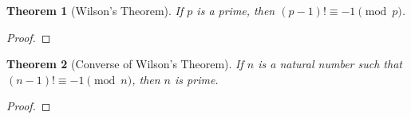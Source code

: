 \documentclass[12pt,leqno]{article}
\numberwithin{equation}{section}
\newtheorem{thm}{Theorem}[section]
\theoremstyle{definition}
\begin{document}

\begin{thm}[Wilson's Theorem]
If $p$ is a prime, then $(p - 1)! \equiv -1 \pmod{p}$.
\end{thm}
\begin{proof}[Proof]
\end{proof}

\begin{thm}[Converse of Wilson's Theorem]
If $n$ is a natural number such that $(n - 1)! \equiv -1 \pmod{n}$,
then $n$ is prime.
\end{thm}
\begin{proof}[Proof]
\end{proof}
\end{document}
